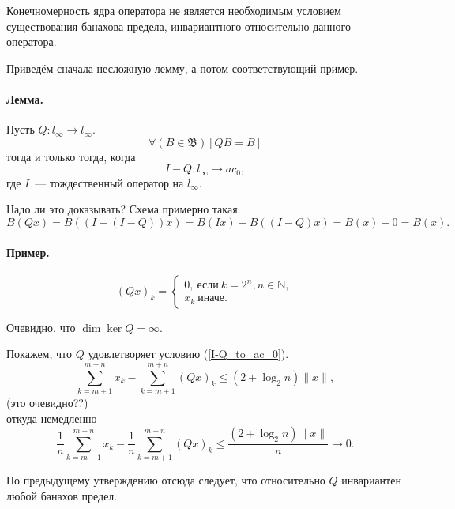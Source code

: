 Конечномерность ядра оператора не является необходимым условием существования
банахова предела, инвариантного относительно данного оператора.

Приведём сначала несложную лемму, а потом соответствующий пример.

\paragraph{Лемма.}

Пусть $Q:l_\infty \to l_\infty$.
\begin{equation}
	\forall(B\in\mathfrak{B})[QB = B]
\end{equation}
тогда и только тогда, когда
\begin{equation}\label{I-Q_to_ac_0}
	I-Q : l_\infty \to ac_0,
\end{equation}
где $I$~--- тождественный оператор на $l_\infty$.

Надо ли это доказывать?
Схема примерно такая:
\begin{equation}
	B(Qx) = B((I-(I-Q))x) =
	B(Ix)-B((I-Q)x) =
	B(x) - 0 = B(x).
\end{equation}


\paragraph{Пример.}

\begin{equation}
	(Qx)_k =
	\begin{cases}
		0,~\mbox{если}~ k = 2^n, n \in\mathbb{N},
		\\
		x_k~\mbox{иначе.}
	\end{cases}
\end{equation}

Очевидно, что $\dim \ker Q = \infty$.

Покажем, что $Q$ удовлетворяет условию (\ref{I-Q_to_ac_0}).
\begin{equation}
	\sum_{k=m+1}^{m+n} x_k - \sum_{k=m+1}^{m+n} (Qx)_k \leqslant (2 + \log_2 n) \|x\|,
\end{equation}
(это очевидно??)\\
откуда немедленно
\begin{equation}
	\frac{1}{n}\sum_{k=m+1}^{m+n} x_k - \frac{1}{n}\sum_{k=m+1}^{m+n} (Qx)_k \leqslant \frac{(2 + \log_2 n) \|x\|}{n} \to 0.
\end{equation}

По предыдущему утверждению отсюда следует, что относительно $Q$ инвариантен любой банахов предел.


